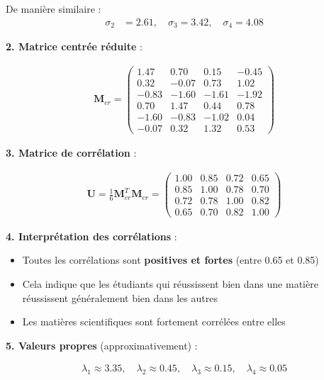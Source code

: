 \documentclass[11pt,a4paper]{article}
\begin{document}
De manière similaire :
\begin{align*}
\sigma_2 &= 2.61, \quad \sigma_3 = 3.42, \quad \sigma_4 = 4.08
\end{align*}

\textbf{2. Matrice centrée réduite} :

\begin{align*}
\mathbf{M}_{cr} = \begin{pmatrix}
1.47 & 0.70 & 0.15 & -0.45 \\
0.32 & -0.07 & 0.73 & 1.02 \\
-0.83 & -1.60 & -1.61 & -1.92 \\
0.70 & 1.47 & 0.44 & 0.78 \\
-1.60 & -0.83 & -1.02 & 0.04 \\
-0.07 & 0.32 & 1.32 & 0.53
\end{pmatrix}
\end{align*}

\textbf{3. Matrice de corrélation} :

\begin{align*}
\mathbf{U} = \frac{1}{6}\mathbf{M}_{cr}^T\mathbf{M}_{cr} = \begin{pmatrix}
1.00 & 0.85 & 0.72 & 0.65 \\
0.85 & 1.00 & 0.78 & 0.70 \\
0.72 & 0.78 & 1.00 & 0.82 \\
0.65 & 0.70 & 0.82 & 1.00
\end{pmatrix}
\end{align*}

\textbf{4. Interprétation des corrélations} :

\begin{itemize}
    \item Toutes les corrélations sont \textbf{positives et fortes} (entre 0.65 et 0.85)
    \item Cela indique que les étudiants qui réussissent bien dans une matière réussissent généralement bien dans les autres
    \item Les matières scientifiques sont fortement corrélées entre elles
\end{itemize}

\textbf{5. Valeurs propres} (approximativement) :

\begin{align*}
\lambda_1 \approx 3.35, \quad \lambda_2 \approx 0.45, \quad \lambda_3 \approx 0.15, \quad \lambda_4 \approx 0.05
\end{align*}
\end{document}
